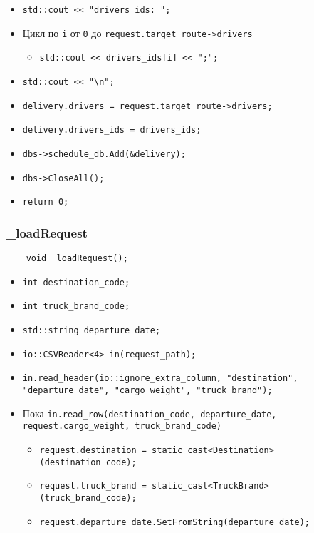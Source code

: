 \begin{itemize}
    \item \verb|std::cout << "drivers ids: ";|
    \item Цикл по \verb|i| от \verb|0| до \verb|request.target_route->drivers|
        \begin{itemize}
            \item \verb|std::cout << drivers_ids[i] << ";";|
        \end{itemize}
    \item \verb|std::cout << "\n";|
    \item \verb|delivery.drivers = request.target_route->drivers;|
    \item \verb|delivery.drivers_ids = drivers_ids;|
    \item \verb|dbs->schedule_db.Add(&delivery);|
    \item \verb|dbs->CloseAll();|
    \item \verb|return 0;|
\end{itemize}

\subsubsection{\_loadRequest}

\begin{lstlisting}
    void _loadRequest();
\end{lstlisting}

\begin{itemize}
    \item \verb|int destination_code;|
    \item \verb|int truck_brand_code;|
    \item \verb|std::string departure_date;|
    \item \verb|io::CSVReader<4> in(request_path);|
    \item \verb|in.read_header(io::ignore_extra_column, "destination", "departure_date", "cargo_weight", "truck_brand");|
    \item Пока \verb|in.read_row(destination_code, departure_date, request.cargo_weight, truck_brand_code)|
        \begin{itemize}
            \item \verb|request.destination = static_cast<Destination>(destination_code);|
            \item \verb|request.truck_brand = static_cast<TruckBrand>(truck_brand_code);|
            \item \verb|request.departure_date.SetFromString(departure_date);|
        \end{itemize}
\end{itemize}

